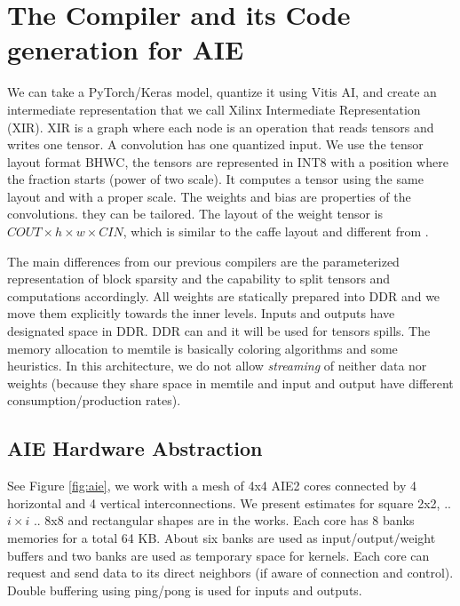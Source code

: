 \documentclass[sigconf]{acmart}
\begin{document}
\section{The Compiler and its Code generation for AIE}
\label{sec:compiler}
We can take a PyTorch/Keras model, quantize it using Vitis AI, and
create an intermediate representation that we call Xilinx Intermediate
Representation (XIR). XIR is a graph where each node is an operation
that reads tensors and writes one tensor.  A convolution has one
quantized input.  We use the tensor layout format BHWC, the tensors
are represented in INT8 with a position where the fraction starts
(power of two scale). It computes a tensor using the same layout and
with a proper scale. The weights and bias are properties of the
convolutions. they can be tailored.  The layout of the weight tensor
is $COUT\times h \times w \times CIN$, which is similar to the caffe
layout \cite{Caffe} and different from \cite{tensorflow2015-whitepaper}. 
\begin{comment}
  (previously DPUV1 and DPUV3int8
  \cite{10.11451/3473334,abs-2110-04327}).
\end{comment}

The main differences from our previous compilers are the parameterized
representation of block sparsity and the capability to split tensors
and computations accordingly. All weights are statically prepared into
DDR and we move them explicitly towards the inner levels. Inputs and
outputs have designated space in DDR. DDR can and it will be used for
tensors spills.  The memory allocation to memtile is basically
coloring algorithms and some heuristics. In this architecture, we do
not allow {\em streaming} of neither data nor weights (because they
share space in memtile and input and output have different
consumption/production rates).

\subsection{AIE Hardware Abstraction}


See Figure \ref{fig:aie}, we work with a mesh of 4x4 AIE2 cores
connected by 4 horizontal and 4 vertical interconnections.  We present
estimates for square 2x2, .. $i\times i$ .. 8x8 and rectangular shapes
are in the works. Each core has 8 banks memories for a total 64
KB. About six banks are used as input/output/weight buffers and two
banks are used as temporary space for kernels. Each core can request
and send data to its direct neighbors (if aware of connection and
control). Double buffering using ping/pong is used for inputs and
outputs.
\end{document}

